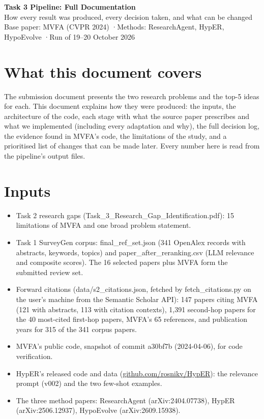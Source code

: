 \documentclass[11pt,a4paper]{article}
\begin{document}
\begin{center}
{\sffamily\bfseries\huge Task 3 Pipeline: Full Documentation}\\[4pt]
{\sffamily\large How every result was produced, every decision taken, and what can be changed}\\[6pt]
{\color{muted}Base paper: MVFA (CVPR 2024) \quad·\quad Methods: ResearchAgent, HypER, HypoEvolve \quad·\quad Run of 19--20 October 2026}
\end{center}
\tableofcontents
\newpage
\section{What this document covers}
The submission document presents the two research problems and the top-5 ideas for each. This document explains how they were produced: the inputs, the architecture of the code, each stage with what the source paper prescribes and what we implemented (including every adaptation and why), the full decision log, the evidence found in MVFA's code, the limitations of the study, and a prioritised list of changes that can be made later. Every number here is read from the pipeline's output files.
\section{Inputs}
\begin{itemize}[leftmargin=1.2em]
\item Task 2 research gaps (Task\_\allowbreak{}3\_\allowbreak{}Research\_\allowbreak{}Gap\_\allowbreak{}Identification.pdf): 15 limitations of MVFA and one broad problem statement.
\item Task 1 SurveyGen corpus: final\_\allowbreak{}ref\_\allowbreak{}set.json (341 OpenAlex records with abstracts, keywords, topics) and paper\_\allowbreak{}after\_\allowbreak{}reranking.csv (LLM relevance and composite scores). The 16 selected papers plus MVFA form the submitted review set.
\item Forward citations (data/s2\_\allowbreak{}citations.json, fetched by fetch\_\allowbreak{}citations.py on the user's machine from the Semantic Scholar API): 147 papers citing MVFA (121 with abstracts, 113 with citation contexts), 1,391 second-hop papers for the 40 most-cited first-hop papers, MVFA's 65 references, and publication years for 315 of the 341 corpus papers.
\item MVFA's public code, snapshot of commit a30bf7b (2024-04-06), for code verification.
\item HypER's released code and data (\url{github.com/rosnikv/HypER}): the relevance prompt (v002) and the two few-shot examples.
\item The three method papers: ResearchAgent (arXiv:2404.07738), HypER (arXiv:2506.12937), HypoEvolve (arXiv:2609.15938).
\end{itemize}
\end{document}
